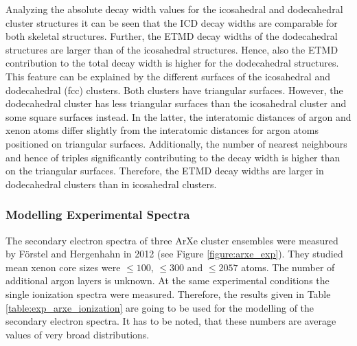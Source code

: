Analyzing the absolute decay width values for the icosahedral and dodecahedral
cluster structures it can be seen that the ICD decay widths are comparable
for both skeletal structures. Further, the ETMD decay widths of the dodecahedral
structures are larger than of the icosahedral structures. Hence, also the
ETMD contribution to the total decay width is higher for the dodecahedral
structures.
This feature can be explained by the different surfaces of the icosahedral
and dodecahedral (fcc) clusters. Both clusters have triangular surfaces.
However, the dodecahedral cluster has less triangular surfaces than the
icosahedral cluster and some square surfaces instead. In the latter, the
interatomic distances of argon and xenon atoms differ slightly
from the interatomic distances for argon atoms positioned on triangular surfaces.
Additionally, the number of nearest neighbours and hence of triples
significantly contributing to the
decay width is higher than on the triangular surfaces.
Therefore, the ETMD decay widths are larger
in dodecahedral clusters than in icosahedral clusters.



\subsubsection{Modelling Experimental Spectra}

The secondary electron spectra of three ArXe cluster ensembles were measured by
Förstel and Hergenhahn in 2012 (see Figure \ref{figure:arxe_exp}).
They studied mean xenon core sizes
were $\le100$, $\le300$ and $\le2057$ atoms. The number of additional argon
layers is unknown.
At the same experimental conditions the single ionization spectra were
measured. Therefore, the results given in Table \ref{table:exp_arxe_ionization}
are going to be used for the modelling of the secondary electron spectra.
It has to be noted, that these numbers are average values of very broad
distributions.

